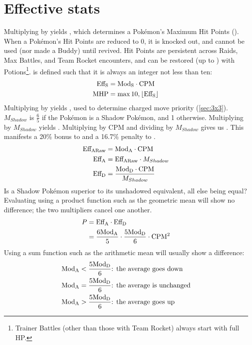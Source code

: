 \section{Effective stats\label{sec:effectivestats}}
Multiplying  by \CPM{} yields , which determines a Pokémon's Maximum Hit Points (\MHP).
When a Pokémon's Hit Points are reduced to 0, it is knocked out, and cannot be
 used (nor made a Buddy) until revived.
Hit Points are persistent across Raids, Max Battles, and Team Rocket encounters,
 and can be restored (up to \MHP) with Potions\footnote{Trainer Battles (other
 than those with Team Rocket) always start with full HP.}.
\MHP is defined such that it is always an integer not less than ten:
\begin{align*}
  \mbox{$\text{Eff}_\text{S}$} &= \mbox{$\text{Mod}_\text{S}$} \cdot \mbox{CPM}{} \\
  \mbox{MHP}{} &= \max{10, \lfloor \mbox{$\text{Eff}_\text{S}$} \rfloor}
\end{align*}
Multiplying  by \CPM{} yields , used to determine charged move priority (\autoref{sec:3x3}).
$M_{Shadow}$ is $\frac{6}{5}$ if the Pokémon is a Shadow Pokémon, and 1 otherwise.
Multiplying  by $M_{Shadow}$ yields .
Multiplying  by CPM and dividing by $M_{Shadow}$ gives us .
This manifests a 20\% bonus to  and a 16.7\% penalty to .
\begin{align*}
  \mbox{$\text{Eff}_\text{ARaw}$} &= \mbox{$\text{Mod}_\text{A}$} \cdot \mbox{CPM}{}\\
  \mbox{$\text{Eff}_\text{A}$} &= \mbox{$\text{Eff}_\text{ARaw}$} \cdot M_{Shadow} \\
  \mbox{$\text{Eff}_\text{D}$} &= \frac{\mbox{$\text{Mod}_\text{D}$} \cdot \mbox{CPM}{}}{M_{Shadow}}
\end{align*}
Is a Shadow Pokémon superior to its unshadowed equivalent, all else being equal?
Evaluating using a product function such as the geometric mean will show no difference;
 the two multipliers cancel one another.
\begin{align*}
  P &= \mbox{$\text{Eff}_\text{A}$} \cdot \mbox{$\text{Eff}_\text{D}$}\\
  &= \frac{6\mbox{$\text{Mod}_\text{A}$}}{5} \cdot \frac{5\mbox{$\text{Mod}_\text{D}$}}{6} \cdot \mbox{CPM}{}^2
\end{align*}
Using a sum function such as the arithmetic mean will usually show a difference:
\begin{align*}
  \mbox{$\text{Mod}_\text{A}$} &< \frac{5\mbox{$\text{Mod}_\text{D}$}}{6}\text{: the average goes down}\\
  \mbox{$\text{Mod}_\text{A}$} &= \frac{5\mbox{$\text{Mod}_\text{D}$}}{6}\text{: the average is unchanged}\\
  \mbox{$\text{Mod}_\text{A}$} &> \frac{5\mbox{$\text{Mod}_\text{D}$}}{6}\text{: the average goes up}
\end{align*}

